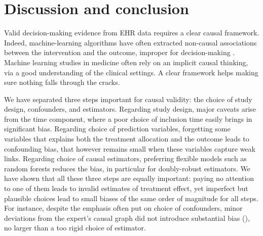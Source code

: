 \documentclass[10pt,letterpaper]{article}
\begin{document}
\section*{Discussion and conclusion}\label{sec:discussion}



Valid decision-making evidence from EHR data requires a clear causal framework.
Indeed, machine-learning algorithms have often extracted non-causal associations
between the intervention and the outcome, improper for decision-making
\cite{winkler2019association,badgeley2019deep,obermeyer2019dissecting}.
Machine learning studies in medicine often rely on an implicit causal
thinking, via a good understanding of the clinical settings.
A clear framework helps making
sure nothing falls through the cracks.

We have separated three steps important for causal validity: the choice
of study design, confounders, and estimators.
%
Regarding study design, major caveats arise from the time component,
where a poor choice of inclusion time easily brings in significant bias. Regarding choice of prediction
variables, forgetting some variables that explains both the treatment
allocation and the outcome leads to confounding bias, that however
remains small when these
variables capture weak links. Regarding choice of causal estimators,
preferring flexible models such as random forests reduces the bias, in
particular for doubly-robust estimators.
%
We have shown that all these three steps are equally important: paying no
attention to one of them leads to invalid estimates of treatment effect,
yet imperfect but plausible choices lead to small biases of the same
order of magnitude for all steps.
%
For instance, despite the emphasis often put on choice of confounders,
minor deviations from the expert's causal graph did not introduce
substantial bias (), no larger than a too
rigid choice of estimator.
\end{document}
